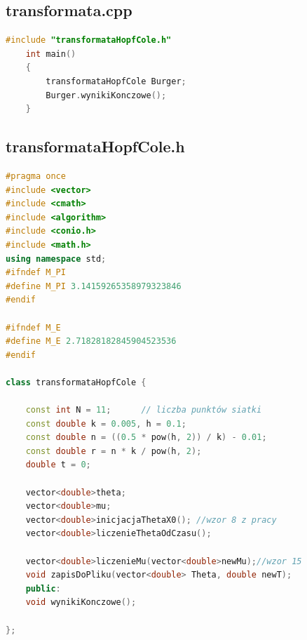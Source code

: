 \documentclass[10pt, a4paper]{article}
\begin{document}
\subsection{transformata.cpp}
\begin{lstlisting}[caption={transformata.cpp},label={transformataCalyKod}, language=C++]
	#include "transformataHopfCole.h"
	int main()
	{
		transformataHopfCole Burger;
		Burger.wynikiKonczowe();
	}
\end{lstlisting}
\subsection{transformataHopfCole.h}
\begin{lstlisting}[caption={transformataHopfCole.h},label={transformataHopfCole.hCalyKod}, language=C++]
#pragma once
#include <vector>
#include <cmath>
#include <algorithm>
#include <conio.h>
#include <math.h>
using namespace std;
#ifndef M_PI
#define M_PI 3.14159265358979323846
#endif

#ifndef M_E
#define M_E 2.71828182845904523536
#endif

class transformataHopfCole {
	
	const int N = 11;      // liczba punktów siatki
	const double k = 0.005, h = 0.1;
	const double n = ((0.5 * pow(h, 2)) / k) - 0.01;
	const double r = n * k / pow(h, 2);
	double t = 0;
	
	vector<double>theta;
	vector<double>mu;
	vector<double>inicjacjaThetaX0(); //wzor 8 z pracy
	vector<double>liczenieThetaOdCzasu();
	
	vector<double>liczenieMu(vector<double>newMu);//wzor 15
	void zapisDoPliku(vector<double> Theta, double newT);
	public:
	void wynikiKonczowe();
	
};
\end{lstlisting}
\end{document}
